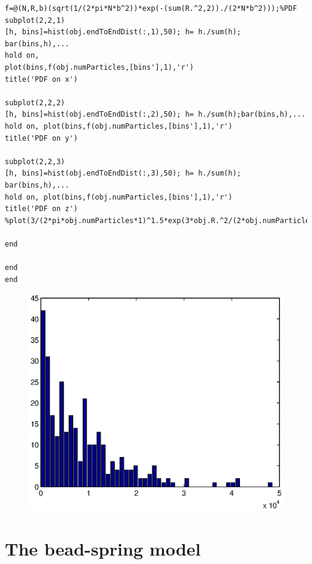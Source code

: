 \documentclass{article}
\begin{document}
\begin{lstlisting}
f=@(N,R,b)(sqrt(1/(2*pi*N*b^2))*exp(-(sum(R.^2,2))./(2*N*b^2)));%PDF 
subplot(2,2,1)
[h, bins]=hist(obj.endToEndDist(:,1),50); h= h./sum(h); bar(bins,h),...
hold on, 
plot(bins,f(obj.numParticles,[bins'],1),'r')
title('PDF on x')

subplot(2,2,2)
[h, bins]=hist(obj.endToEndDist(:,2),50); h= h./sum(h);bar(bins,h),...
hold on, plot(bins,f(obj.numParticles,[bins'],1),'r')
title('PDF on y')

subplot(2,2,3)
[h, bins]=hist(obj.endToEndDist(:,3),50); h= h./sum(h); bar(bins,h),...
hold on, plot(bins,f(obj.numParticles,[bins'],1),'r')
title('PDF on z')
%plot(3/(2*pi*obj.numParticles*1)^1.5*exp(3*obj.R.^2/(2*obj.numParticles*1)))

end

end
end 

\end{lstlisting}
\begin{figure}[H]
	\includegraphics[width=6.2in]{MetTime3.eps} 
	 
	 \end{figure}
	 \section{The bead-spring model}
\end{document}
